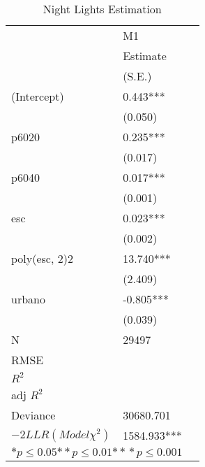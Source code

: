\begin{table}
\caption{Night Lights Estimation}\label{regrlabl}
 \begin{tabular}{@{}l*{2}{l}@{}}
\hline
  &\multicolumn{1}{l}{M1  }\tabularnewline
 &\multicolumn{1}{l}{Estimate}\tabularnewline
 &\multicolumn{1}{l}{(S.E.)}\tabularnewline
 \hline
 \hline
  (Intercept) & 0.443*** \tabularnewline
 &(0.050)\tabularnewline
  p6020 & 0.235*** \tabularnewline
 &(0.017)\tabularnewline
  p6040 & 0.017*** \tabularnewline
 &(0.001)\tabularnewline
  esc & 0.023*** \tabularnewline
 &(0.002)\tabularnewline
  poly(esc, 2)2 & 13.740*** \tabularnewline
 &(2.409)\tabularnewline
  urbano & -0.805*** \tabularnewline
 &(0.039)\tabularnewline
 \hline
 N&\multicolumn{1}{l}{29497} \tabularnewline
 RMSE&\tabularnewline
 $R^2$&\tabularnewline
 adj $R^2$&\tabularnewline
 Deviance&30680.701\tabularnewline
 $-2LLR (Model \chi^2)$  &   1584.933*** \tabularnewline
 \hline
\hline
 
 \multicolumn{2}{l}{  ${*  p}\le 0.05$${*\!\!*  p}\le 0.01$${*\!\!*\!\!*  p}\le 0.001$}\tabularnewline
 \end{tabular}
 \end{table}

